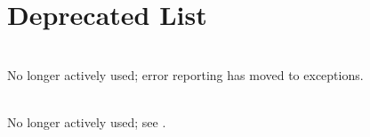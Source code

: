 \chapter{Deprecated List }
\hypertarget{deprecated}{}\label{deprecated}

\begin{DoxyRefList}
\item[{\parbox[t]{\linewidth}{Member \doxylink{classcomplex_1_1_math_complex_a9a52bd26db26418555479e5482a060ed}{complex.Math\+Complex.get\+Error} ()}}]\hfill \\
\label{deprecated__deprecated000002}%
%
No longer actively used; error reporting has moved to exceptions.  
\item[{\parbox[t]{\linewidth}{Member \doxylink{classcomplex_1_1_math_complex_a214b169ae487d3c83a706e092e94c5e5}{complex.Math\+Complex.set\+Error} (String s)}}]\hfill \\
\label{deprecated__deprecated000003}%
%
No longer actively used; see {\ttfamily {}}. 
\end{DoxyRefList}